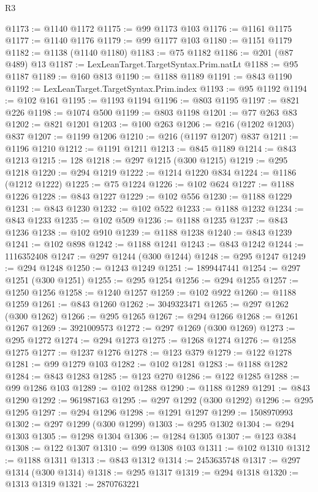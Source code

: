 \begin{lexlean}{R3}
\begin{coremodule}
@1173 := @1140 @1172
@1175 := @99 @1173 @103
@1176 := @1161 @1175
@1177 := @1140 @1176
@1179 := @99 @1177 @103
@1180 := @1151 @1179
@1182 := @1138 (@1140 @1180)
@1183 := @75 @1182
@1186 := @201 (@87 @489) @13
@1187 := LexLeanTarget.TargetSyntax.Prim.natLt
@1188 := @95 @1187
@1189 := @160 @813
@1190 := @1188 @1189
@1191 := @843 @1190
@1192 := LexLeanTarget.TargetSyntax.Prim.index
@1193 := @95 @1192
@1194 := @102 @161
@1195 := @1193 @1194
@1196 := @803 @1195
@1197 := @821 @226
@1198 := @1074 @500
@1199 := @803 @1198
@1201 := @77 @263 @83
@1202 := @821 @1201
@1203 := @100 @263
@1206 := @216 (@1202 @1203) @837
@1207 := @1199 @1206
@1210 := @216 (@1197 @1207) @837
@1211 := @1196 @1210
@1212 := @1191 @1211
@1213 := @845 @1189
@1214 := @843 @1213
@1215 := 128
@1218 := @297 @1215 (@300 @1215)
@1219 := @295 @1218
@1220 := @294 @1219
@1222 := @1214 @1220 @834
@1224 := @1186 (@1212 @1222)
@1225 := @75 @1224
@1226 := @102 @624
@1227 := @1188 @1226
@1228 := @843 @1227
@1229 := @102 @556
@1230 := @1188 @1229
@1231 := @843 @1230
@1232 := @102 @522
@1233 := @1188 @1232
@1234 := @843 @1233
@1235 := @102 @509
@1236 := @1188 @1235
@1237 := @843 @1236
@1238 := @102 @910
@1239 := @1188 @1238
@1240 := @843 @1239
@1241 := @102 @898
@1242 := @1188 @1241
@1243 := @843 @1242
@1244 := 1116352408
@1247 := @297 @1244 (@300 @1244)
@1248 := @295 @1247
@1249 := @294 @1248
@1250 := @1243 @1249
@1251 := 1899447441
@1254 := @297 @1251 (@300 @1251)
@1255 := @295 @1254
@1256 := @294 @1255
@1257 := @1250 @1256
@1258 := @1240 @1257
@1259 := @102 @922
@1260 := @1188 @1259
@1261 := @843 @1260
@1262 := 3049323471
@1265 := @297 @1262 (@300 @1262)
@1266 := @295 @1265
@1267 := @294 @1266
@1268 := @1261 @1267
@1269 := 3921009573
@1272 := @297 @1269 (@300 @1269)
@1273 := @295 @1272
@1274 := @294 @1273
@1275 := @1268 @1274
@1276 := @1258 @1275
@1277 := @1237 @1276
@1278 := @123 @379
@1279 := @122 @1278
@1281 := @99 @1279 @103
@1282 := @102 @1281
@1283 := @1188 @1282
@1284 := @843 @1283
@1285 := @123 @270
@1286 := @122 @1285
@1288 := @99 @1286 @103
@1289 := @102 @1288
@1290 := @1188 @1289
@1291 := @843 @1290
@1292 := 961987163
@1295 := @297 @1292 (@300 @1292)
@1296 := @295 @1295
@1297 := @294 @1296
@1298 := @1291 @1297
@1299 := 1508970993
@1302 := @297 @1299 (@300 @1299)
@1303 := @295 @1302
@1304 := @294 @1303
@1305 := @1298 @1304
@1306 := @1284 @1305
@1307 := @123 @384
@1308 := @122 @1307
@1310 := @99 @1308 @103
@1311 := @102 @1310
@1312 := @1188 @1311
@1313 := @843 @1312
@1314 := 2453635748
@1317 := @297 @1314 (@300 @1314)
@1318 := @295 @1317
@1319 := @294 @1318
@1320 := @1313 @1319
@1321 := 2870763221

\end{coremodule}
\end{lexlean}
